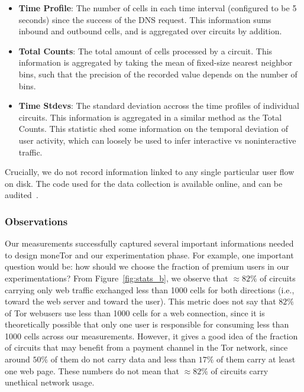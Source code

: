 \begin{itemize}
\item \textbf{Time Profile}: The number of cells in each time interval
  (configured to be 5 seconds) since the success of the DNS request. This
  information sums inbound and outbound cells, and is aggregated over circuits
  by addition.
\item \textbf{Total Counts}: The total amount of cells processed by a
  circuit. This information is aggregated by taking the mean of fixed-size
  nearest neighbor bins, such that the precision of the recorded value depends
  on the number of bins.
\item \textbf{Time Stdevs}: The standard deviation accross the time profiles of
  individual circuits. This information is aggregated in a similar method as the
  Total Counts. This statistic shed some information on the temporal
  deviation of user activity, which can loosely be used to infer interactive vs
  noninteractive traffic.
\end{itemize} Crucially, we do not record information linked to any single
particular user flow on disk. The code used for the data collection is available
online, and can be audited~\cite{code-mt-stats}.

\subsubsection{Observations}

Our measurements successfully captured several important informations needed to
design moneTor and our experimentation phase. For example, one important question would be:
how should we choose the fraction of premium users in our experimentations? From
Figure~\ref{fig:stats_b}, we observe that $\approx 82\%$ of circuits carrying
only web traffic exchanged less than 1000 cells for both directions (i.e.,
toward the web server and toward the user). This metric does not say that $82\%$
of Tor webusers use less than 1000 cells for a web connection, since it is
theoretically possible that only one user is responsible for consuming less than
1000 cells across our measurements. However, it gives a good idea of the
fraction of circuits that may benefit from a payment channel in the Tor network,
since around $50\%$ of them do not carry data and less than $17\%$ of them carry
at least one web page. These numbers do not mean that $\approx 82\%$ of circuits
carry unethical network usage.

